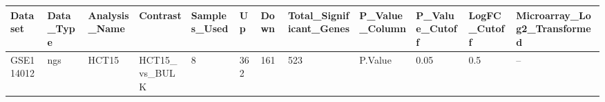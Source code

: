\begingroup
\tiny
\setlength{\tabcolsep}{2pt}
\renewcommand{\arraystretch}{1.18}
\begin{tabular}{@{}llllllllllll@{}}
\toprule
Dataset & Data\_Type & Analysis\_Name & Contrast & Samples\_Used & Up & Down & Total\_Significant\_Genes & P\_Value\_Column & P\_Value\_Cutoff & LogFC\_Cutoff & Microarray\_Log2\_Transformed \\
\midrule
GSE114012 & ngs & HCT15 & HCT15\_vs\_BULK & 8 & 362 & 161 & 523 & P.Value & 0.05 & 0.5 & -- \\
\bottomrule
\end{tabular}
\endgroup
